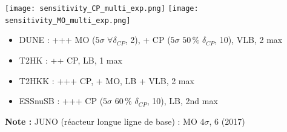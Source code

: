     {
        \begin{specialframe}
            \flushleft\hspace{-2cm}\texttt{[image: sensitivity\_CP\_multi\_exp.png]}
            \texttt{[image: sensitivity\_MO\_multi\_exp.png]}\\
            \begin{itemize}
                \item DUNE : +++ MO ($5\sigma$ $\forall\delta_{CP}$, \SI{2}{\year}), + CP ($5\sigma$ $50\,\%$ $\delta_{CP}$, \SI{10}{\year}), VLB, 2 max
                \item T2HK : ++ CP, LB, 1 max
                \item T2HKK : +++ CP, + MO, LB + VLB, 2 max
                \item ESSnuSB : +++ CP ($5\sigma$ $60\,\%$ $\delta_{CP}$, \SI{10}{\year}), LB, 2nd max
            \end{itemize}
            \begin{scriptsize}
                \flushleft\textbf{Note :} JUNO (réacteur longue ligne de base) : MO $4\sigma$, \SI{6}{\year} (2017)
            \end{scriptsize}
        \end{specialframe}
    }
